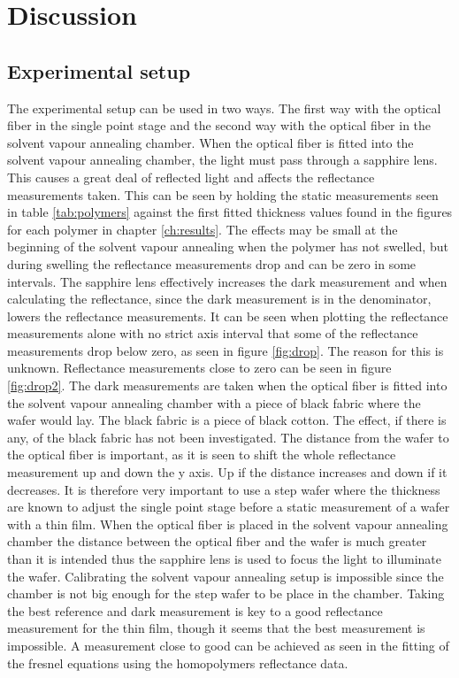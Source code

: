 \documentclass[MasterThesisMain.tex]{subfiles}
\begin{document}
\chapter{Discussion} \label{ch:discussion}

\section{Experimental setup}
The experimental setup can be used in two ways. The first way with the optical fiber in the single point stage and the second way with the optical fiber in the solvent vapour annealing chamber. When the optical fiber is fitted into the solvent vapour annealing chamber, the light must pass through a sapphire lens. This causes a great deal of reflected light and affects the reflectance measurements taken. This can be seen by holding the static measurements seen in table \ref{tab:polymers} against the first fitted thickness values found in the figures for each polymer in chapter \ref{ch:results}. The effects may be small at the beginning of the solvent vapour annealing when the polymer has not swelled, but during swelling the reflectance measurements drop and can be zero in some intervals. The sapphire lens effectively increases the dark measurement and when calculating the reflectance, since the dark measurement is in the denominator, lowers the reflectance measurements. It can be seen when plotting the reflectance measurements alone with no strict axis interval that some of the reflectance measurements drop below zero, as seen in figure \ref{fig:drop}. The reason for this is unknown. Reflectance measurements close to zero can be seen in figure \ref{fig:drop2}. The dark measurements are taken when the optical fiber is fitted into the solvent vapour annealing chamber with a piece of black fabric where the wafer would lay. The black fabric is a piece of black cotton. The effect, if there is any, of the black fabric has not been investigated. The distance from the wafer to the optical fiber is important, as it is seen to shift the whole reflectance measurement up and down the y axis. Up if the distance increases and down if it decreases. It is therefore very important to use a step wafer where the thickness are known to adjust the single point stage before a static measurement of a wafer with a thin film. When the optical fiber is placed in the solvent vapour annealing chamber the distance between the optical fiber and the wafer is much greater than it is intended thus the sapphire lens is used to focus the light to illuminate the wafer. Calibrating the solvent vapour annealing setup is impossible since the chamber is not big enough for the step wafer to be place in the chamber. Taking the best reference and dark measurement is key to a good reflectance measurement for the thin film, though it seems that the best measurement is impossible. A measurement close to good can be achieved as seen in the fitting of the fresnel equations using the homopolymers reflectance data.
\end{document}
